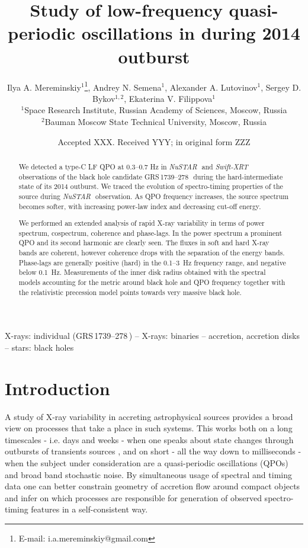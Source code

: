 \documentclass[a4paper,fleqn,usenatbib]{mnras}
\title[Study of low-frequency QPO in  \grs]{Study of low-frequency quasi-periodic oscillations in \grs during 2014 outburst}
\author[I. A. Mereminskiy et al.]{
Ilya A. Mereminskiy$^{1}$\thanks{E-mail: i.a.mereminskiy@gmail.com},
Andrey N. Semena$^{1}$,
Alexander A. Lutovinov$^{1}$,\newauthor
Sergey D. Bykov$^{1,2}$,
Ekaterina V. Filippova$^{1}$
\\
$^{1}$Space Research Institute, Russian Academy of Sciences, Moscow, Russia\\
$^{2}$Bauman Moscow State Technical University, Moscow, Russia\\
}
\date{Accepted XXX. Received YYY; in original form ZZZ}
\def\grs{{GRS\,1739--278\,}}
\def\swiftx{{\em Swift-XRT\,}}
\def\nustar{{\em NuSTAR\,}}
\begin{document}
\label{firstpage}
\pagerange{\pageref{firstpage}--\pageref{lastpage}}
\maketitle

\begin{abstract}
We detected a type-C LF QPO at 0.3--0.7 Hz in \nustar\, and \swiftx\, observations of the black hole candidate \grs\, during the hard-intermediate state of its 2014 outburst. We traced the evolution of spectro-timing properties of the source during \nustar\, observation. 
As QPO frequency increases, the source spectrum becomes softer, with increasing power-law index and decreasing cut-off energy.

We performed an extended analysis of rapid X-ray variability in terms of power spectrum, cospectrum, coherence and phase-lags. 
In the power spectrum a prominent QPO and its second harmonic are clearly seen. 
The fluxes in soft and hard X-ray bands are coherent, however coherence drops with the separation of the energy bands. 
Phase-lags are generally positive (hard) in the 0.1--3~Hz frequency range, and negative below 0.1~Hz.
Measurements of the inner disk radius obtained with the spectral models accounting for the metric around black hole and QPO frequency together with the relativistic precession model points towards very massive black hole.
\end{abstract}

\begin{keywords}
X-rays: individual (\grs) -- X-rays: binaries -- accretion, accretion disks  -- stars: black holes
\end{keywords}


\section{Introduction}
\label{sec:intro} 
A study of X-ray variability in accreting astrophysical sources provides a broad view on processes that take a place in such systems. 
This works both on a long timescales - i.e. days and weeks - when one speaks about state changes through outbursts of transients sources \citep[see e.g.][]{homan05, heil15}, and on short - all the way down to milliseconds - when the subject under consideration are a quasi-periodic oscillations (QPOs) and broad band stochastic noise. 
By simultaneous usage of spectral and timing data one can better constrain geometry of accretion flow around compact objects and infer on which processes are responsible for generation of observed spectro-timing features in a self-consistent way.
\end{document}
